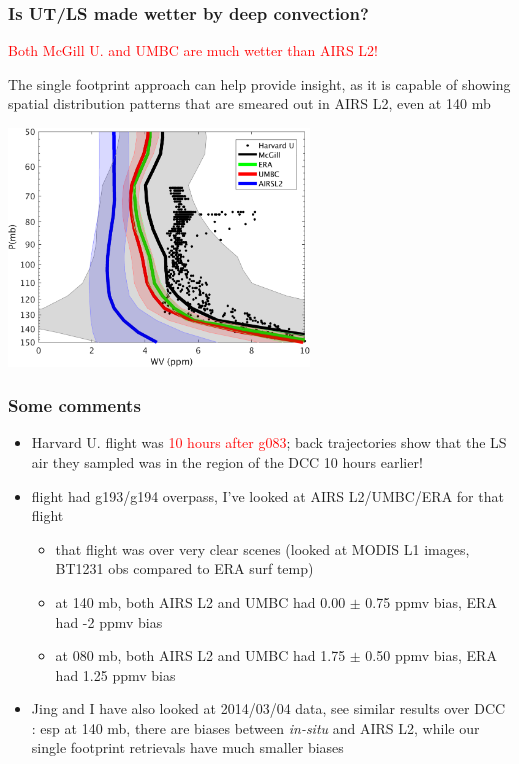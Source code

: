 \documentclass[10pt,t]{beamer}
\begin{document}
\begin{frame}
\frametitle{Is UT/LS made wetter by deep convection?}

  \textcolor{red}{Both McGill U. and UMBC are much wetter than AIRS L2!}

The single footprint approach can help provide insight, as it is
capable of showing spatial distribution patterns that are smeared out
in AIRS L2, even at 140 mb

  \begin{center}
    \noindent\includegraphics[width=0.6\textwidth]{Figs/FigsDCC/delta_WV_with_unc_2005_06_17.png}
  \end{center}

\end{frame}

\begin{frame}
\frametitle{Some comments}
\begin{itemize}
  \item Harvard U. flight was \textcolor{red}{10 hours after g083}; back trajectories show that the LS air they
        sampled was in the region of the DCC 10 hours earlier!
  \item flight had g193/g194 overpass, I've looked at AIRS L2/UMBC/ERA for that flight
    \begin{itemize}
      \item that flight was over very clear scenes (looked at MODIS L1 images, BT1231 obs compared to ERA surf temp)
      \item at 140 mb, both AIRS L2 and UMBC had 0.00 $\pm$ 0.75 ppmv bias, ERA had -2 ppmv bias
      \item at 080 mb, both AIRS L2 and UMBC had 1.75 $\pm$ 0.50 ppmv bias, ERA had 1.25 ppmv bias      
    \end{itemize}
  \item Jing and I have also looked at 2014/03/04 data, see similar results over DCC : esp at 140 mb, there
        are biases between \emph{in-situ} and AIRS L2, while our single footprint retrievals have much smaller biases    
\end{itemize}
\end{frame}
\end{document}
